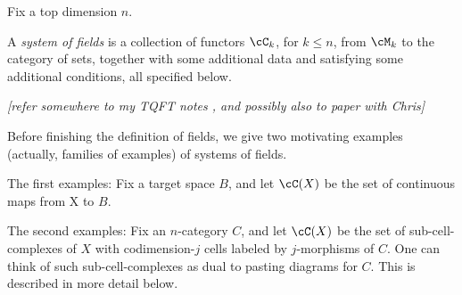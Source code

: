 \documentclass[11pt,leqno]{amsart}
\def\nn#1{{{\it \small [#1]}}}
\begin{document}
Fix a top dimension $n$.

A {\it system of fields}
is a collection of functors $\cC_k$, for $k \le n$, from $\cM_k$ to the
category of sets,
together with some additional data and satisfying some additional conditions, all specified below.

\nn{refer somewhere to my TQFT notes \cite{kw:tqft}, and possibly also to paper with Chris}

Before finishing the definition of fields, we give two motivating examples
(actually, families of examples) of systems of fields.

The first examples: Fix a target space $B$, and let $\cC(X)$ be the set of continuous maps
from X to $B$.

The second examples: Fix an $n$-category $C$, and let $\cC(X)$ be 
the set of sub-cell-complexes of $X$ with codimension-$j$ cells labeled by
$j$-morphisms of $C$.
One can think of such sub-cell-complexes as dual to pasting diagrams for $C$.
This is described in more detail below.
\end{document}
